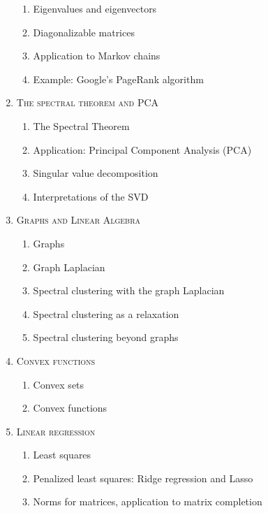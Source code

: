 \begin{enumerate}[label=\textbf{\arabic*.}]
\vspace{-0.2cm}
\begin{enumerate}[label=\arabic*.,noitemsep]
\item Eigenvalues and eigenvectors
\item Diagonalizable matrices
\item Application to Markov chains
\item Example: Google's PageRank algorithm
\end{enumerate}
\item \textsc{The spectral theorem and PCA}
\vspace{-0.2cm}
\begin{enumerate}[label=\arabic*.,noitemsep]
\item The Spectral Theorem
\item Application: Principal Component Analysis (PCA)
\item Singular value decomposition
\item Interpretations of the SVD
\end{enumerate}
\item \textsc{Graphs and Linear Algebra}
\vspace{-0.2cm}
\begin{enumerate}[label=\arabic*.,noitemsep]
\item Graphs
\item Graph Laplacian
\item Spectral clustering with the graph Laplacian
\item Spectral clustering as a relaxation
\item Spectral clustering beyond graphs
\end{enumerate}
\item \textsc{Convex functions}
\vspace{-0.2cm}
\begin{enumerate}[label=\arabic*.,noitemsep]
\item Convex sets
\item Convex functions
\end{enumerate}
\item \textsc{Linear regression}
\vspace{-0.2cm}
\begin{enumerate}[label=\arabic*.,noitemsep]
\item Least squares
\item Penalized least squares: Ridge regression and Lasso
\item Norms for matrices, application to matrix completion
\end{enumerate}

\end{enumerate}

